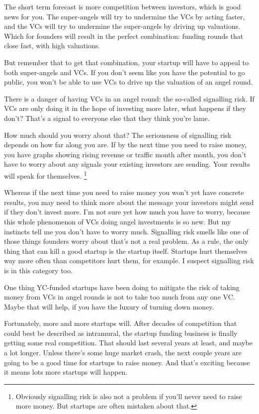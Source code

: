 \documentclass[12pt]{book}
\begin{document}
The short term forecast is more competition between investors, which is
good news for you. The super-angels will try to undermine the VCs by
acting faster, and the VCs will try to undermine the super-angels by
driving up valuations. Which for founders will result in the perfect
combination: funding rounds that close fast, with high valuations.

But remember that to get that combination, your startup will have to
appeal to both super-angels and VCs. If you don't seem like you have the
potential to go public, you won't be able to use VCs to drive up the
valuation of an angel round.

There is a danger of having VCs in an angel round: the so-called
signalling risk. If VCs are only doing it in the hope of investing more
later, what happens if they don't? That's a signal to everyone else that
they think you're lame.

How much should you worry about that? The seriousness of signalling risk
depends on how far along you are. If by the next time you need to raise
money, you have graphs showing rising revenue or traffic month after
month, you don't have to worry about any signals your existing investors
are sending. Your results will speak for themselves.
\footnote{Obviously signalling risk is also not a problem if you'll never
need to raise more money. But startups are often mistaken about that.}

Whereas if the next time you need to raise money you won't yet have
concrete results, you may need to think more about the message your
investors might send if they don't invest more. I'm not sure yet how
much you have to worry, because this whole phenomenon of VCs doing angel
investments is so new. But my instincts tell me you don't have to worry
much. Signalling risk smells like one of those things founders worry
about that's not a real problem. As a rule, the only thing that can kill
a good startup is the startup itself. Startups hurt themselves way more
often than competitors hurt them, for example. I suspect signalling risk
is in this category too.

One thing YC-funded startups have been doing to mitigate the risk of
taking money from VCs in angel rounds is not to take too much from any
one VC. Maybe that will help, if you have the luxury of turning down
money.

Fortunately, more and more startups will. After decades of competition
that could best be described as intramural, the startup funding business
is finally getting some real competition. That should last several years
at least, and maybe a lot longer. Unless there's some huge market crash,
the next couple years are going to be a good time for startups to raise
money. And that's exciting because it means lots more startups will
happen.
\end{document}

